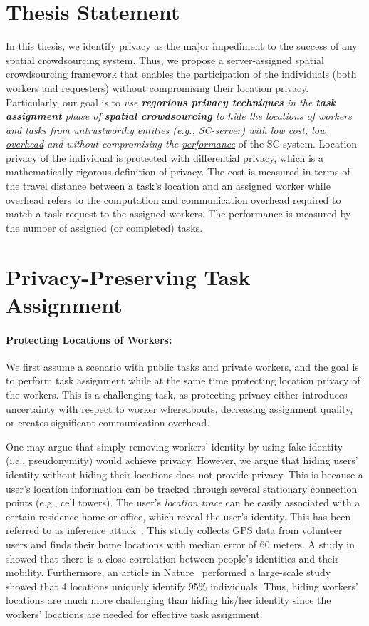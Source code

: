 \documentclass{USC-Thesis}
\numberwithin{equation}{chapter}
\begin{document}
\section{Thesis Statement}
In this thesis, we identify privacy as the major impediment to the success of any spatial crowdsourcing system. Thus, we propose a server-assigned spatial crowdsourcing framework that enables the participation of the individuals (both workers and requesters) without compromising their location privacy. Particularly, our goal is to \emph{use \textbf{regorious privacy techniques} in the \textbf{task assignment} phase of \textbf{spatial crowdsourcing} to hide the locations of workers and tasks from untrustworthy entities (e.g., SC-server) with \underline{low cost}, \underline{low overhead} and without compromising the \underline{performance}} of the SC system. Location privacy of the individual is protected with differential privacy, which is a mathematically rigorous definition of privacy. The cost is measured in terms of the travel distance between a task's location and an assigned worker while overhead refers to the computation and communication overhead required to match a task request to the assigned workers. The performance is measured by the number of assigned (or completed) tasks.

\section{Privacy-Preserving Task Assignment}
\label{sec:intro:ta}

\paragraph{Protecting Locations of Workers:} We first assume a scenario with public tasks and private workers, and the goal is to perform task assignment while at the same time protecting location privacy of the workers. This is a challenging task, as protecting privacy either introduces uncertainty with respect to worker whereabouts, decreasing assignment quality, or creates significant communication overhead.

One may argue that simply removing workers' identity by using fake identity (i.e., pseudonymity) would achieve privacy. However, we argue that hiding users' identity without hiding their locations does not provide privacy. This is because a user's location information can be tracked through several stationary connection points (e.g., cell towers). The user's \emph{location trace} can be easily associated with a certain residence home or office, which reveal the user's identity. This has been referred to as inference attack~\cite{krumm2007inference}. This study collects GPS data from volunteer users and finds their home locations with median error of 60 meters.
A study in~\cite{gonzalez2008understanding} showed that there is a close correlation between people's identities and their mobility.
Furthermore, an article in Nature~\cite{DeMontjoye2013locationunique} performed a large-scale study showed that 4 locations uniquely identify 95\% individuals.
Thus, hiding workers' locations are much more challenging than hiding his/her identity since the workers' locations are needed for effective task assignment.
\end{document}
